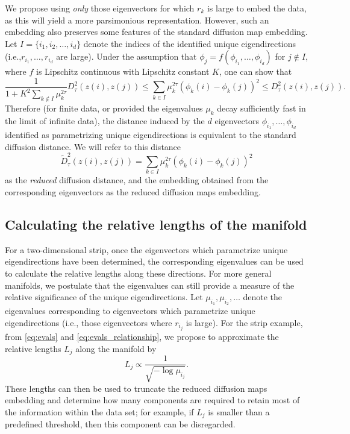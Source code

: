 We propose using {\em only} those eigenvectors for which $r_k$ is large to embed the data, as this will yield a more parsimonious representation.
%
However, such an embedding also preserves some features of the standard diffusion map embedding.
%
Let $I = \{i_1, i_2, \dots, i_d \}$ denote the indices of the identified unique eigendirections (i.e.,$r_{i_1}, \dots, r_{i_d}$ are large).
%
Under the assumption that $\phi_j = f \left( \phi_{i_1}, \dots, \phi_{i_d} \right)$ for $j \not\in I$, where $f$ is Lipschitz continuous with Lipschitz constant $K$, one can show that
\begin{equation}
\frac{1}{1+K^2 \sum_{k \not\in I} \mu_k^{2\tau}} D^2_\tau(z(i), z(j)) \le \sum_{k \in I} \mu_k^{2 \tau} \left( \phi_k(i) - \phi_k(j)  \right)^2 \le D^2_\tau(z(i), z(j)).
\end{equation}
%
Therefore (for finite data, or provided the eigenvalues $\mu_k$ decay sufficiently fast in the limit of infinite data), the distance induced by the $d$ eigenvectors $\phi_{i_1}, \dots, \phi_{i_d}$ identified as parametrizing unique eigendirections is equivalent to the standard diffusion distance.
%
We will refer to this distance
\begin{equation}
\tilde{D}^2_\tau(z(i), z(j)) = \sum_{k \in I} \mu_k^{2 \tau} \left( \phi_k(i) - \phi_k(j)  \right)^2
\end{equation}
%
as the {\em reduced} diffusion distance, and the embedding obtained from the corresponding eigenvectors as the reduced diffusion maps embedding.
%

\subsection{Calculating the relative lengths of the manifold} \label{sec:relative_lengths}

For a two-dimensional strip, once the eigenvectors which parametrize unique eigendirections have been determined, the corresponding eigenvalues can be used to calculate the relative lengths along these directions.
%
For more general manifolds, we postulate that the eigenvalues can still provide a measure of the relative significance of the unique eigendirections.
%
Let $\mu_{i_1}, \mu_{i_2}, \dots$ denote the eigenvalues corresponding to eigenvectors which parametrize unique eigendirections (i.e., those eigenvectors where $r_{i_j}$ is large).
%
For the strip example, from \eqref{eq:evals} and \eqref{eq:evals_relationship}, we propose to approximate the relative lengths $L_j$  along the manifold by
\begin{equation} \label{eq:est_lengths}
L_j \propto \frac{1}{\sqrt{-\log \mu_{i_j}}}.
\end{equation}
%
These lengths can then be used to truncate the reduced diffusion maps embedding and determine how many components are required to retain most of the information within the data set;
for example, if $L_j$ is smaller than a predefined threshold, then this component can be disregarded.


